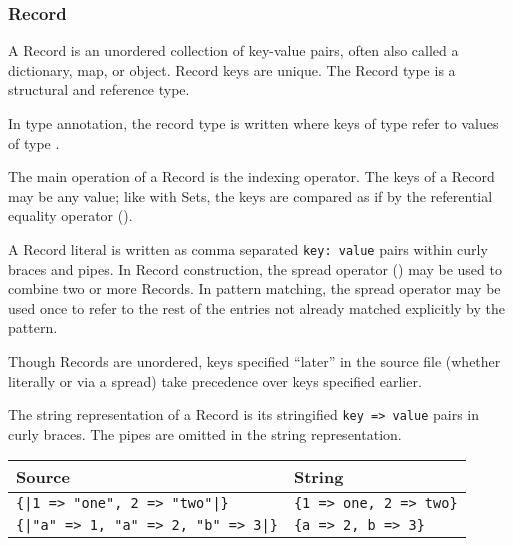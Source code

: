 \subsubsection{Record}

A Record is an unordered collection of key-value pairs, often also called
a dictionary, map, or object. Record keys are unique. The Record type is a
structural and reference type.

In type annotation, the record type is written  where keys of
type  refer to values of type .

The main operation of a Record is the indexing operator. The keys of a
Record may be any value; like with Sets, the keys are compared as if by
the referential equality operator (\op{==}).

A Record literal is written as comma separated \texttt{key: value} pairs
within curly braces and pipes. In Record construction, the spread operator ()
may be used to combine two or more Records. In pattern matching, the spread
operator may be used once to refer to the rest of the entries not already
matched explicitly by the pattern.

Though Records are unordered, keys specified ``later'' in the source file
(whether literally or via a spread) take precedence over keys specified
earlier.

The string representation of a Record is its stringified \texttt{key => value}
pairs in curly braces. The pipes are omitted in the string representation.

\begin{table}[H]
    \centering
    \begin{tabular}{ll}
        \hline
        \textbf{Source} & \textbf{String} \\
        \hline
        \texttt{\{|1 => "one", 2 => "two"|\}} & \texttt{\{1 => one, 2 => two\}} \\
        \texttt{\{|"a" => 1, "a" => 2, "b" => 3|\}} & \texttt{\{a => 2, b => 3\}} \\
        \hline
    \end{tabular}
\end{table}
